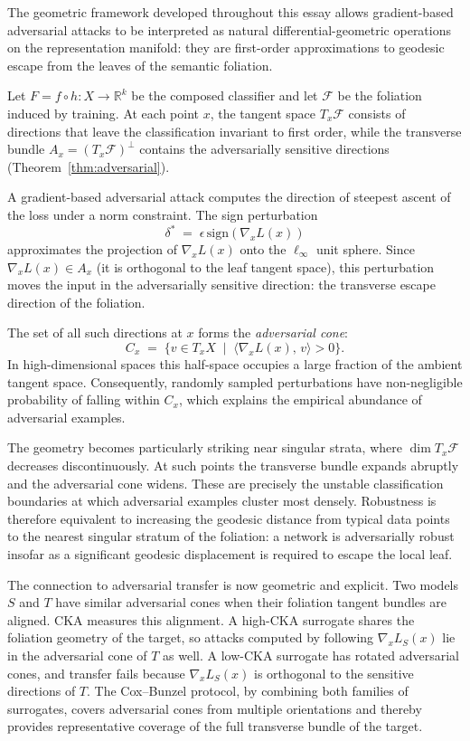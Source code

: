 \documentclass[12pt,a4paper]{article}
\theoremstyle{plain}
\theoremstyle{definition}
\newcommand{\sign}{\mathrm{sign}}
\begin{document}
The geometric framework developed throughout this essay allows gradient-based
adversarial attacks to be interpreted as natural differential-geometric
operations on the representation manifold: they are first-order approximations
to geodesic escape from the leaves of the semantic foliation.

Let $F = f \circ h : X \to \mathbb{R}^k$ be the composed classifier and let
$\mathcal{F}$ be the foliation induced by training. At each point $x$, the
tangent space $T_x \mathcal{F}$ consists of directions that leave the
classification invariant to first order, while the transverse bundle $A_x =
(T_x \mathcal{F})^\perp$ contains the adversarially sensitive directions
(Theorem~\ref{thm:adversarial}).

A gradient-based adversarial attack computes the direction of steepest ascent
of the loss under a norm constraint. The sign perturbation
\[
\delta^* \;=\; \epsilon\,\sign(\nabla_x L(x))
\]
approximates the projection of $\nabla_x L(x)$ onto the $\ell_\infty$ unit
sphere. Since $\nabla_x L(x) \in A_x$ (it is orthogonal to the leaf tangent
space), this perturbation moves the input in the adversarially sensitive
direction: the transverse escape direction of the foliation.

The set of all such directions at $x$ forms the \emph{adversarial cone}:
\[
C_x \;=\; \bigl\{ v \in T_x X \;\mid\;
\langle \nabla_x L(x),\, v \rangle > 0 \bigr\}.
\]
In high-dimensional spaces this half-space occupies a large fraction of the
ambient tangent space. Consequently, randomly sampled perturbations have
non-negligible probability of falling within $C_x$, which explains the
empirical abundance of adversarial examples.

The geometry becomes particularly striking near singular strata, where $\dim
T_x \mathcal{F}$ decreases discontinuously. At such points the transverse
bundle expands abruptly and the adversarial cone widens. These are precisely the
unstable classification boundaries at which adversarial examples cluster most
densely. Robustness is therefore equivalent to increasing the geodesic distance
from typical data points to the nearest singular stratum of the foliation: a
network is adversarially robust insofar as a significant geodesic displacement
is required to escape the local leaf.

The connection to adversarial transfer is now geometric and explicit. Two models
$S$ and $T$ have similar adversarial cones when their foliation tangent bundles
are aligned. CKA measures this alignment. A high-CKA surrogate shares the
foliation geometry of the target, so attacks computed by following $\nabla_x
L_S(x)$ lie in the adversarial cone of $T$ as well. A low-CKA surrogate has
rotated adversarial cones, and transfer fails because $\nabla_x L_S(x)$ is
orthogonal to the sensitive directions of $T$. The Cox--Bunzel protocol, by
combining both families of surrogates, covers adversarial cones from multiple
orientations and thereby provides representative coverage of the full transverse
bundle of the target.
\end{document}
